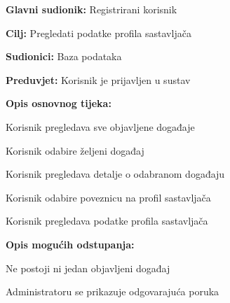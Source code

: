 				
				\noindent {}
				\begin{packed_item}
					
					\item \textbf{Glavni sudionik:} Registrirani korisnik
					\item  \textbf{Cilj:} Pregledati podatke profila sastavljača
					\item  \textbf{Sudionici:} Baza podataka
					\item  \textbf{Preduvjet:} Korisnik je prijavljen u sustav
					\item  \textbf{Opis osnovnog tijeka:}
					
					\item[] \begin{packed_enum}
						
						\item Korisnik pregledava sve objavljene događaje
						\item Korisnik odabire željeni događaj
						\item Korisnik pregledava detalje o odabranom događaju
						\item Korisnik odabire poveznicu na profil sastavljača
						\item Korisnik pregledava podatke profila sastavljača
					\end{packed_enum}
					
					\item  \textbf{Opis mogućih odstupanja:}
					
					\item[] \begin{packed_item}
						
						\item[1.a] Ne postoji ni jedan objavljeni događaj
						\item[] \begin{packed_enum}
							
							\item Administratoru se prikazuje odgovarajuća poruka
							
						\end{packed_enum}
						
					\end{packed_item}
				\end{packed_item}
				

